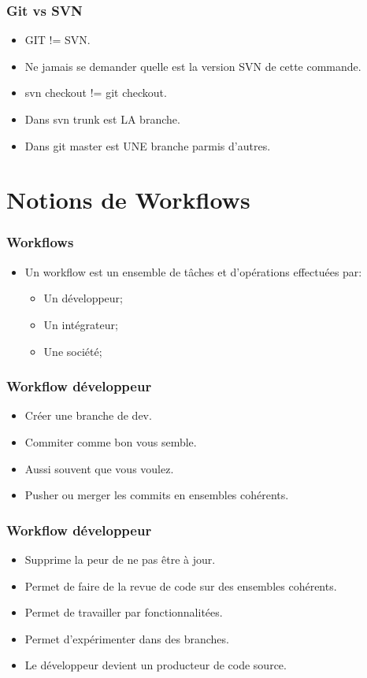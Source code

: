 \documentclass{beamer}
\begin{document}
    \begin{frame}
      \frametitle{Git vs SVN}
      \begin{itemize}
        \item GIT != SVN.
        \item Ne jamais se demander quelle est la version SVN de cette commande.
        \item svn checkout != git checkout.
        \item Dans svn trunk est LA branche.
        \item Dans git master est UNE branche parmis d'autres.
      \end{itemize}
    \end{frame}

    \section{Notions de Workflows}
    \begin{frame}
      \frametitle{Workflows}
      \begin{itemize}
        \item Un workflow est un ensemble de tâches et d'opérations effectuées par:
          \begin{itemize}
            \item Un développeur;
            \item Un intégrateur;
            \item Une société;
          \end{itemize}
      \end{itemize}
    \end{frame}
    \begin{frame}
      \frametitle{Workflow développeur}
      \begin{itemize}
        \item Créer une branche de dev.
        \item Commiter comme bon vous semble.
        \item Aussi souvent que vous voulez.
        \item Pusher ou merger les commits en ensembles cohérents.
      \end{itemize}
    \end{frame}

    \begin{frame}
      \frametitle{Workflow développeur}
      \begin{itemize}
        \item Supprime la peur de ne pas être à jour.
        \item Permet de faire de la revue de code sur des ensembles cohérents.
        \item Permet de travailler par fonctionnalitées.
        \item Permet d'expérimenter dans des branches.
        \item Le développeur devient un producteur de code source.
      \end{itemize}
    \end{frame}
\end{document}
